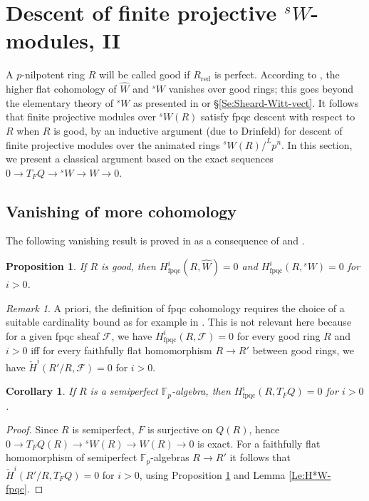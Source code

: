 \documentclass[a4paper,11pt]{amsart}
\theoremstyle{plain}
\newtheorem{Prop}[equation]{Proposition}
\newtheorem{Cor}[equation]{Corollary}
\theoremstyle{definition}
\theoremstyle{remark}
\newtheorem{Remark}[equation]{Remark}
\newcommand{\bPr}{\begin{Prop}}
\newcommand{\ePr}{\end{Prop}}
\newcommand{\bCo}{\begin{Cor}}
\newcommand{\eCo}{\end{Cor}}
\newcommand{\bRe}{\begin{Remark}}
\newcommand{\eRe}{\end{Remark}}
\newcommand{\bproof}{\begin{proof}}
\newcommand{\eproof}{\end{proof}}
\numberwithin{equation}{section}
\newcommand{\FFF}{\mathcal{F}}
\newcommand{\FF}{{\mathbb{F}}}
\DeclareMathOperator{\fpqc}{fpqc}
\DeclareMathOperator{\red}{red}
\newcommand{\sW}{{}^sW}
\newcommand{\cclearpage}{}%
\begin{document}
\cclearpage
\section{Descent of finite projective $\sW$-modules, II}
\label{Se:Descent-II}

A $p$-nilpotent ring $R$ will be called good if $R_{\red}$ is perfect.
According to \cite{BMVZ}, the higher flat cohomology of $\hat W$ and $\sW$ vanishes over good rings;
this goes beyond the elementary theory of $\sW$ as presented in \cite{Drinfeld:Ring-stacks-conjecturally} or \S\ref{Se:Sheard-Witt-vect}.
It follows that finite projective modules over $\sW(R)$ satisfy fpqc descent with respect to $R$ when $R$ is good, by an inductive argument (due to Drinfeld) for descent of finite projective modules over the animated rings $\sW(R)/^Lp^n$.
In this section, we present a classical argument  based on the exact sequences $0\to T_FQ\to\sW\to W\to 0$.

\subsection{Vanishing of more cohomology}

The following vanishing result is proved in \cite{BMVZ} as a consequence of \cite[Proposition 7.4.8]{Bhatt-Lurie:Absolute} and \cite[Theorem 1.18]{Bragg-Olsson:Representability}.

\bPr
\label{Pr:Hi-fpqc-hatW-sW}
If $R$ is good, then $H^i_{\fpqc}(R,\hat W)=0$ and $H^i_{\fpqc}(R,\sW)=0$ for $i>0$.
\ePr

\bRe
A priori, the definition of fpqc cohomology requires the choice of a suitable cardinality bound as for example in \cite[\S1.4]{Cesnavicius-Scholze}. This is not relevant here because for a given fpqc sheaf $\FFF$, we have $H^i_{\fpqc}(R,\FFF)=0$ for every good ring $R$ and $i>0$ iff for every faithfully flat homomorphism $R\to R'$ between good rings, we have $\check H^i(R'/R,\FFF)=0$ for $i>0$.
\eRe

\bCo
\label{Co:Hi-fpqc-TFQ}
If $R$ is a semiperfect $\FF_p$-algebra, then $H^i_{\fpqc}(R,T_FQ)=0$ for $i>0$.
\eCo

\bproof
Since $R$ is semiperfect, $F$ is surjective on $Q(R)$, hence $0\to T_FQ(R)\to\sW(R)\to W(R)\to 0$ is exact. For a faithfully flat homomorphism of semiperfect $\FF_p$-algebras $R\to R'$ it follows that $\check H^i(R'/R,T_FQ)=0$ for $i>0$, using Proposition \ref{Pr:Hi-fpqc-hatW-sW} and Lemma \ref{Le:H*W-fpqc}.
\eproof
\end{document}
